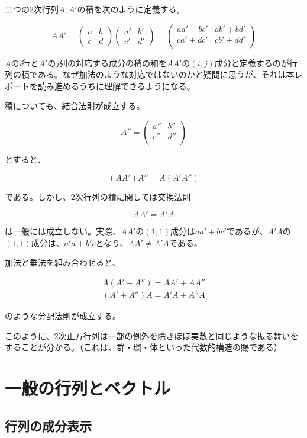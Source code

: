 \documentclass[dvipdfmx,autodetect-engine]{jsarticle}
\begin{document}
二つの2次行列$A, A'$の積を次のように定義する。

$$
AA' = \begin{pmatrix}
a & b \\
c & d
\end{pmatrix}
\begin{pmatrix}
a' & b' \\
c' & d'
\end{pmatrix} = 
\begin{pmatrix}
aa' + bc' & ab' + bd' \\
ca' + dc' & cb' + dd' \\
\end{pmatrix}
$$

$A$の$i$行と$A'$の$j$列の対応する成分の積の和を$AA'$の$(i, j)$成分と定義するのが行列の積である。なぜ加法のような対応ではないのかと疑問に思うが、それは本レポートを読み進めるうちに理解できるようになる。

積についても、結合法則が成立する。

$$
A'' = \begin{pmatrix}
a'' & b'' \\
c'' & d'' \\
\end{pmatrix}
$$

とすると、

$$
(AA')A'' = A(A'A'')
$$

である。しかし、2次行列の積に関しては交換法則

$$
AA' = A'A
$$

は一般には成立しない。実際、$AA'$の$(1, 1)$成分は$aa' + bc'$であるが、$A'A$の$(1, 1)$成分は、$a'a + b'c$となり、$AA' \neq A'A$である。

加法と乗法を組み合わせると、

\begin{eqnarray*}
A(A' + A'') = AA' + AA'' \\
(A' + A'')A = A'A + A''A
\end{eqnarray*}

のような分配法則が成立する。

このように、2次正方行列は一部の例外を除きほぼ実数と同じような振る舞いをすることが分かる。（これは、群・環・体といった代数的構造の賜である）

\section{一般の行列とベクトル}

\subsection{行列の成分表示}
\end{document}
